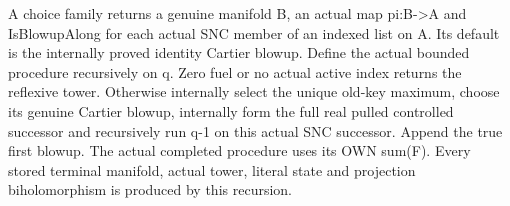 \begin{definition}
\label{hir:nc-ordered-choice-actual-recursion}
\leanok
A choice family returns a genuine manifold B, an actual map pi:B->A and
IsBlowupAlong for each actual SNC member of an indexed list on A. Its default
is the internally proved identity Cartier blowup. Define the actual bounded
procedure recursively on q. Zero fuel or no actual active index returns the
reflexive tower. Otherwise internally select the unique old-key maximum,
choose its genuine Cartier blowup, internally form the full real pulled
controlled successor and recursively run q-1 on this actual SNC successor.
Append the true first blowup. The actual completed procedure uses its OWN
sum(F). Every stored terminal manifold, actual tower, literal state and
projection biholomorphism is produced by this recursion.
\end{definition}

